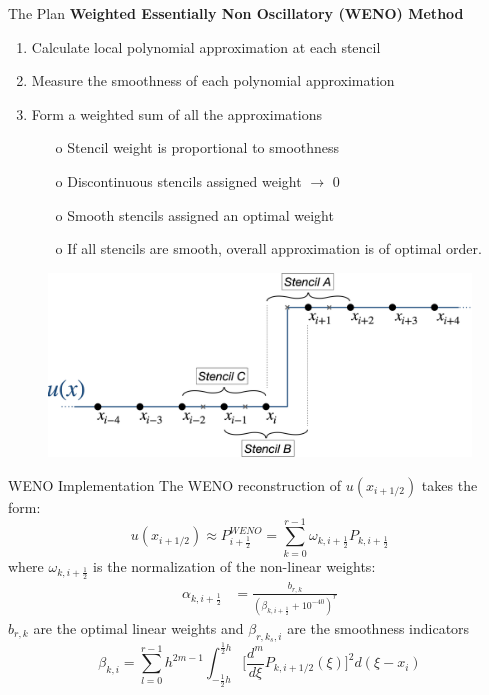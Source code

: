 \documentclass[10pt]{beamer}
\begin{document}
  \begin{frame}{The Plan}
    \textbf{Weighted Essentially Non Oscillatory (WENO) Method}
    \begin{enumerate}
      \item Calculate local polynomial approximation at each stencil
      \item Measure the smoothness of each polynomial approximation
      \item Form a weighted sum of all the approximations
          \begin{itemize}
            \item[o] Stencil weight is proportional to smoothness
            \item[o] Discontinuous stencils assigned weight $\rightarrow$ 0
            \item[o] Smooth stencils assigned an optimal weight 
            \item[o] If all stencils are smooth, overall approximation is of optimal order. 
          \end{itemize}
    \end{enumerate}


    \begin{figure}[H]
      \centering
      \includegraphics[scale=0.175]{DiscontinuousStencil.png}
      \end{figure}
  \end{frame}


\begin{frame}{WENO Implementation}
  The WENO reconstruction of $u(x_{i+1/2})$ takes the form:
  \begin{equation}
    u(x_{i+1/2})\approx P^{WENO}_{i+\frac{1}{2}}=\sum_{k=0}^{r-1}\omega_{k,i+\frac{1}{2}}P_{k,i+\frac{1}{2}}\label{eq:WenoEquation}
  \end{equation}
  where $\omega_{k,i+\frac{1}{2}}$ is the normalization of the non-linear weights:
  \begin{align}
    \alpha_{k,i+\frac{1}{2}}&=\frac{b_{r,k}}{(\beta_{k,i+\frac{1}{2}} +10^{-40})^r}
  \end{align}
  $b_{r,k}$ are the optimal linear weights and 
  $\beta_{r,k_s,i}$ are the smoothness indicators
  \begin{equation}
    \beta_{k,i} = \sum_{l=0}^{r-1}h^{2m-1}\int_{-\frac{1}{2}h}^{\frac{1}{2}h}\bigg[\frac{d^m}{d\xi}P_{k,i+1/2}(\xi)\bigg]^2d(\xi-x_i)\label{eq:OptimalCoefficients}
  \end{equation}
\end{frame}
\end{document}
